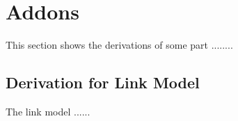 
\chapter{Addons} %

\label{add} %


This section shows the derivations of some part ........

\section{Derivation for Link Model}\label{link}
The link model ......